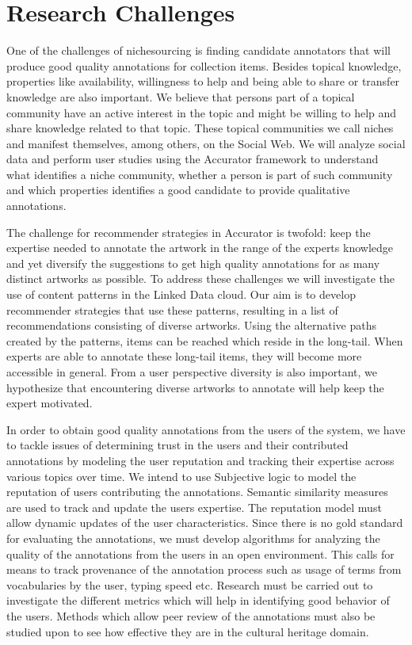 \section{Research Challenges}\label{use_case}

One of the challenges of nichesourcing is finding candidate annotators that will produce good quality annotations for collection items. Besides topical knowledge, properties like availability, willingness to help and being able to share or transfer knowledge are also important. We believe that persons part of a topical community have an active interest in the topic and might be willing to help and share knowledge related to that topic. These topical communities we call niches and manifest themselves, among others, on the Social Web. We will analyze social data and perform user studies using the Accurator framework to understand what identifies a niche community, whether a person is part of such community and which properties identifies a good candidate to provide qualitative annotations. 

The challenge for recommender strategies in Accurator is twofold: keep the expertise needed to annotate the artwork in the range of the experts knowledge and yet diversify the suggestions to get high quality annotations for as many distinct artworks as possible. To address these challenges we will investigate the use of content patterns in the Linked Data cloud. Our aim is to develop recommender strategies that use these patterns, resulting in a list of recommendations consisting of diverse artworks. Using the alternative paths created by the patterns, items can be reached which reside in the long-tail. When experts are able to annotate these long-tail items, they will become more accessible in general. From a user perspective diversity is also important, we hypothesize that encountering diverse artworks to annotate will help keep the expert motivated.

In order to obtain good quality annotations from the users of the system, we have to tackle issues of determining trust in the users and their contributed annotations by modeling the user reputation and tracking their expertise across various topics over time. We intend to use Subjective logic to model the reputation of users contributing the annotations. Semantic similarity measures are used to track and update the users expertise. The reputation model must allow dynamic updates of the user characteristics. Since there is no gold standard for evaluating the annotations, we must develop algorithms for analyzing the quality of the annotations from the users in an open environment. This calls for means to track provenance of the annotation process such as usage of terms from vocabularies by the user, typing speed etc. Research must be carried out to investigate the different metrics which will help in identifying good behavior of the users. Methods which allow peer review of the annotations must also be studied upon to see how effective they are in the cultural heritage domain. 

